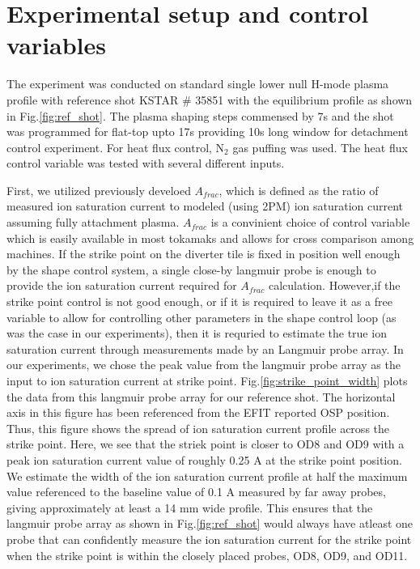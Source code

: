 

\section{Experimental setup and control variables}
\label{sec:control_variables}



The experiment was conducted on standard single lower null H-mode plasma profile with reference shot KSTAR \# 35851 with the equilibrium profile as shown in Fig.\ref{fig:ref_shot}.
The plasma shaping steps commensed by 7s and the shot was programmed for flat-top upto 17s providing 10s long window for detachment control experiment.
For heat flux control, N$_2$ gas puffing was used.
The heat flux control variable was tested with several different inputs.

First, we utilized previously develoed $A_{frac}$\cite{Eldon_2022_PPCF}, which is defined as the ratio of measured ion saturation current to modeled (using 2PM\cite{Leonard_2018_PPCF}) ion saturation current assuming fully attachment plasma.
$A_{frac}$ is a convinient choice of control variable which is easily available in most tokamaks and allows for cross comparison among machines.
If the strike point on the diverter tile is fixed in position well enough by the shape control system, a single close-by langmuir probe is enough to provide the ion saturation current required for $A_{frac}$ calculation.
However,if the strike point control is not good enough, or if it is required to leave it as a free variable to allow for controlling other parameters in the shape control loop (as was the case in our experiments), then it is requried to estimate the true ion saturation current through measurements made by an Langmuir probe array.
In our experiments, we chose the peak value from the langmuir probe array as the input to ion saturation current at strike point.
Fig.\ref{fig:strike_point_width} plots the data from this langmuir probe array for our reference shot.
The horizontal axis in this figure has been referenced from the EFIT reported \ac{OSP} position.
Thus, this figure shows the spread of ion saturation current profile across the strike point.
Here, we see that the striek point is closer to OD8 and OD9 with a peak ion saturation current value of roughly 0.25 A at the strike point position.
We estimate the width of the ion saturation current profile at half the maximum value referenced to the baseline value of 0.1 A measured by far away probes, giving approximately at least a 14 mm wide profile.
This ensures that the langmuir probe array as shown in Fig.\ref{fig:ref_shot} would always have atleast one probe that can confidently measure the ion saturation current for the strike point when the strike point is within the closely placed probes, OD8, OD9, and OD11.

